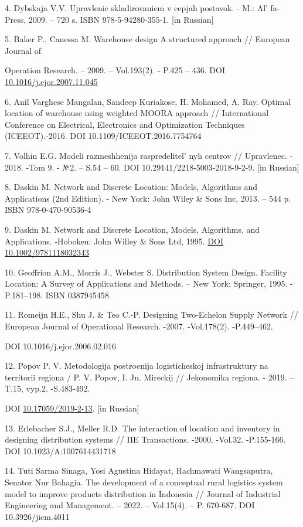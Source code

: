 4. Dybskaja V.V. Upravlenie skladirovaniem v cepjah postavok. - M.:
Al' fa-Press, 2009. -- 720 s. ISBN 978-5-94280-355-1.
{[}in Russian{]}

5. Baker P., Canessa M. Warehouse design A structured approach //
European Journal of

Operation Research. -- 2009. -- Vol.193(2). - P.425 -- 436. DOI
\href{http://dx.doi.org/10.1016/j.ejor.2007.11.045}{10.1016/j.ejor.2007.11.045}

6. Anil Varghese Mangalan, Sandeep Kuriakose, H. Mohamed, A. Ray. Optimal
location of warehouse using weighted MOORA approach // International
Conference on Electrical, Electronics and Optimization Techniques
(ICEEOT).-2016. DOI 10.1109/ICEEOT.2016.7754764

7. Volhin E.G. Modeli razmeshhenija raspredelitel' nyh
centrov // Upravlenec. - 2018. -Tom 9. - №2. -- S.54 -- 60. DOI
10.29141/2218-5003-2018-9-2-9. {[}in Russian{]}

8. Daskin M. Network and Discrete Location: Models, Algorithms and
Applications (2nd Edition). - New York: John Wiley \& Sons Inc, 2013. --
544 p. ISBN 978-0-470-90536-4

9. Daskin M. Network and Discrete Location, Models, Algorithms, and
Applications. -Hoboken: John Willey \& Sons Ltd, 1995.
\href{http://dx.doi.org/10.1002/9781118032343}{DOI
10.1002/9781118032343}

10. Geoffrion A.M., Morris J., Webster S. Distribution System Design.
Facility Location: A Survey of Applications and Methods. -- New York:
Springer, 1995. -P.181--198. ISBN 0387945458.

11. Romeijn H.E., Shu J. \& Teo C.-P. Designing Two-Echelon Supply
Network // European Journal of Operational Research. -2007. -Vol.178(2).
-P.449--462.

DOI 10.1016/j.ejor.2006.02.016

12. Popov P. V. Metodologija postroenija logisticheskoj infrastruktury na
territorii regiona / P. V. Popov, I. Ju. Mireckij // Jekonomika regiona.
- 2019. -- T.15, vyp.2. -S.483-492.

DOI \href{http://dx.doi.org/10.17059/2019-2-13}{10.17059/2019-2-13}.
{[}in Russian{]}

13. Erlebacher S.J., Meller R.D. The interaction of location and
inventory in designing distribution systems // IIE Transactions. -2000.
-Vol.32. -P.155-166. DOI 10.1023/A:1007614431718

14. Tuti Sarma Sinaga, Yosi Agustina Hidayat, Rachmawati Wangsaputra,
Senator Nur Bahagia. The development of a conceptual rural logistics
system model to improve products distribution in Indonesia // Journal of
Industrial Engineering and Management. -- 2022. -- Vol.15(4). -- P.
670-687. DOI 10.3926/jiem.4011

